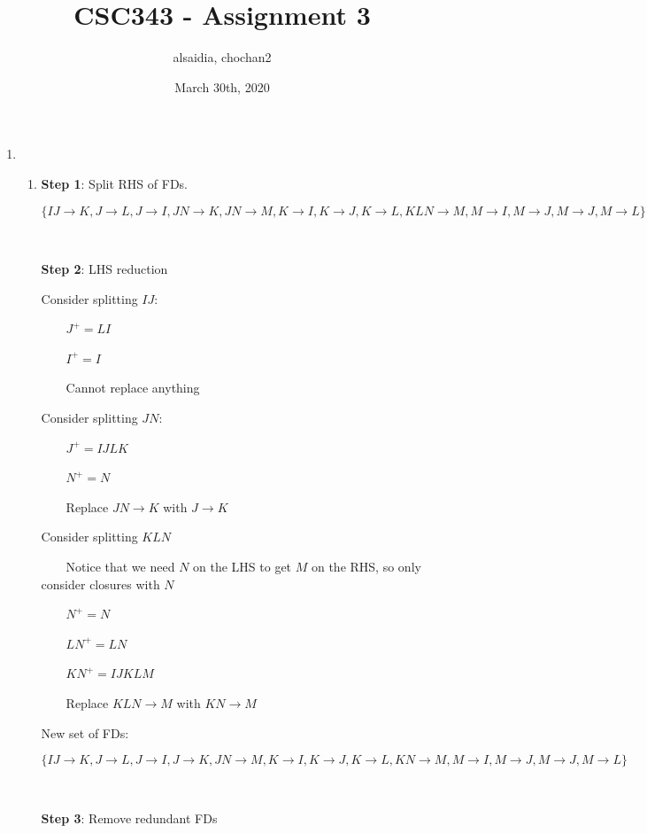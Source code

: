 \documentclass[boldsans]{article}
\title{CSC343 - Assignment 3}
\author{alsaidia, chochan2 }
\date{March 30th, 2020}
\begin{document}
\newcommand{\ntab}[1]{\textbf{#1}}
\newcommand{\fd}[2]{#1\rightarrow #2}
\maketitle

\begin{enumerate}
    \item 
    \begin{enumerate}
        \item 
        \textbf{Step 1}: Split RHS of FDs.
        
        $\{\fd{IJ}{K}, \fd{J}{L}, \fd{J}{I}, \fd{JN}{K}, \fd{JN}{M}, \fd{K}{I}, \fd{K}{J}, \fd{K}{L}, \fd{KLN}{M}, \fd{M}{I}, \fd{M}{J}, \fd{M}{J}, \fd{M}{L}\}$
        
        \ 
        
        \textbf{Step 2}: LHS reduction
        
        Consider splitting $IJ$:
        
        \ \ \ \ $J^+=LI$
        
        \ \ \ \ $I^+=I$
        
        \ \ \ \ Cannot replace anything
        
        Consider splitting $JN$:
    
        \ \ \ \ $J^+=IJLK$
        
        \ \ \ \ $N^+=N$
        
        \ \ \ \ Replace $\fd{JN}{K}$ with $\fd{J}{K}$
        
        Consider splitting $KLN$

        \ \ \ \ Notice that we need $N$ on the LHS to get $M$ on the RHS, so only consider closures with $N$
        
        \ \ \ \ $N^+=N$
        
        \ \ \ \ $LN^+=LN$
        
        \ \ \ \ $KN^+=IJKLM$
        
        \ \ \ \ Replace $\fd{KLN}{M}$ with $\fd{KN}{M}$
        
        New set of FDs:
        
        $\{\fd{IJ}{K}, \fd{J}{L}, \fd{J}{I}, \fd{J}{K}, \fd{JN}{M}, \fd{K}{I}, \fd{K}{J}, \fd{K}{L}, \fd{KN}{M}, \fd{M}{I}, \fd{M}{J}, \fd{M}{J}, \fd{M}{L}\}$
        
        \ 
        
        \textbf{Step 3}: Remove redundant FDs
        

\end{enumerate}
\end{enumerate}
\end{document}

